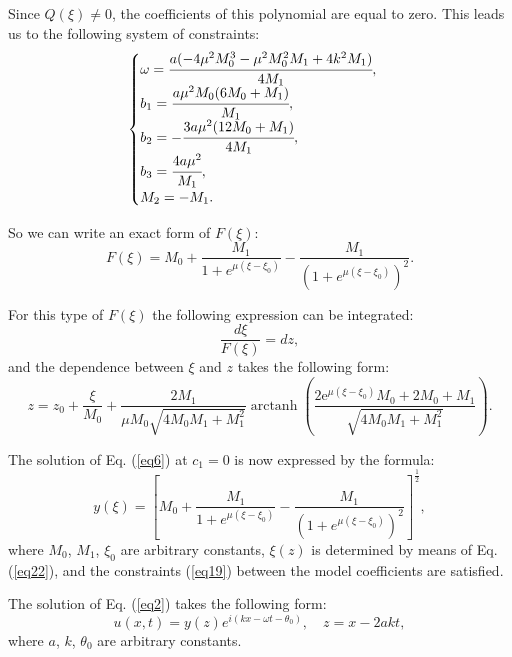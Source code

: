 \documentclass[preprint,12pt]{elsarticle}
\DeclareMathOperator\arctanh{arctanh}
\begin{document}
Since \(Q(\xi) \neq 0\), the coefficients of this polynomial are equal to zero. This leads us to the following system of constraints:
\begin{equation}\label{eq19}
\begin{cases}
\omega=\cfrac{a (-4 \mu^{2} M_{0}^{3}-\mu^{2} M_{0}^{2} M_{1}+4 k^{2} M_{1})}{4 M_{1}},\\
b_{1}=\cfrac{a \mu^{2} M_{0} (6 M_{0}+M_{1})}{M_{1}},\\
b_{2}=-\cfrac{3 a \mu^{2} (12 M_{0}+M_{1})}{4 M_{1}},\\
b_{3}=\cfrac{4 a \mu^{2}}{M_{1}},\\
M_{2}=-M_{1}.
\end{cases}
\end{equation}

So we can write an exact form of \(F(\xi)\):
\begin{equation}
F(\xi)=M_{0}+\frac{M_{1}}{1+e^{\mu(\xi-\xi_{0})}}-\frac{M_{1}}{\left(1+e^{\mu(\xi-\xi_{0})}\right)^{2}}.
\end{equation}

For this type of \(F(\xi)\) the following expression can be integrated:
\begin{equation}
\frac{d \xi}{F(\xi)}=dz,
\end{equation}
and the dependence between \(\xi\) and \(z\) takes the following form:
\begin{equation} \label{eq22}
z=z_{0}+\frac{\xi}{M_{0}}+\frac{2 M_{1}}{\mu M_{0} \sqrt{4 M_{0} M_{1}+M_{1}^{2}}} \arctanh \left(\frac{2 {\mathrm e}^{\mu (\xi-\xi_{0})} M_{0}+2 M_{0}+M_{1}}{\sqrt{4 M_{0} M_{1}+M_{1}^{2}}}\right).
\end{equation}

The solution of Eq. (\ref{eq6}) at \(c_{1}=0\) is now expressed by the formula:
\begin{equation}\label{eq23}
y(\xi)=\left[ M_{0}+\frac{M_{1}}{1+e^{\mu(\xi-\xi_{0})}}-\frac{M_{1}}{\left(1+e^{\mu(\xi-\xi_{0})}\right)^{2}}\right]^{\frac{1}{2}},
\end{equation}
where \(M_{0}\), \(M_{1}\), \(\xi_{0}\) are arbitrary constants, \(\xi(z)\) is determined by means of Eq. (\ref{eq22}), and the constraints (\ref{eq19}) between the model coefficients are satisfied.

The solution of Eq. (\ref{eq2}) takes the following form:
\begin{equation}\label{eq24}
u(x,t)=y(z)e^{i(kx-\omega t-\theta_{0})}, \quad z=x-2akt,
\end{equation}
where \(a\), \(k\), \(\theta_{0}\) are arbitrary constants. 
\end{document}
